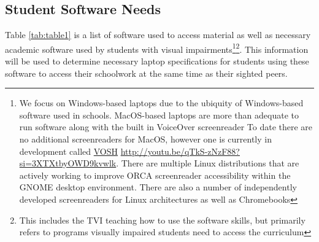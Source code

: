 \pagebreak\hypertarget{student-software-needs}{}\subsection{Student Software Needs}\label{student-software-needs}
Table \ref{tab:table1} is a list of software used to access material as well as necessary academic software used by students with visual impairments\footnote{\raggedright We focus on Windows-based laptops due to the ubiquity of Windows-based software used in schools. MacOS-based laptops are more than adequate to run software along with the built in VoiceOver screenreader  To date there are no additional screenreaders for MacOS, however one is currently in development called \href{http://youtu.be/qTkS-zNzF88?si=3XTXtbyOWD9kvwlk}{VOSH} \url{http://youtu.be/qTkS-zNzF88?si=3XTXtbyOWD9kvwlk}. There are multiple Linux distributions that are actively working to improve ORCA screenreader accessibility within the GNOME desktop environment. There are also a number of independently developed screenreaders for Linux architectures as well as Chromebooks}\fnsep\footnote{\raggedright This includes the TVI teaching how to use the software skills, but primarily refers to programs visually impaired students need to access the curriculum}. This information will be used to determine necessary laptop specifications for students using these software to access their schoolwork at the same time as their sighted peers.


